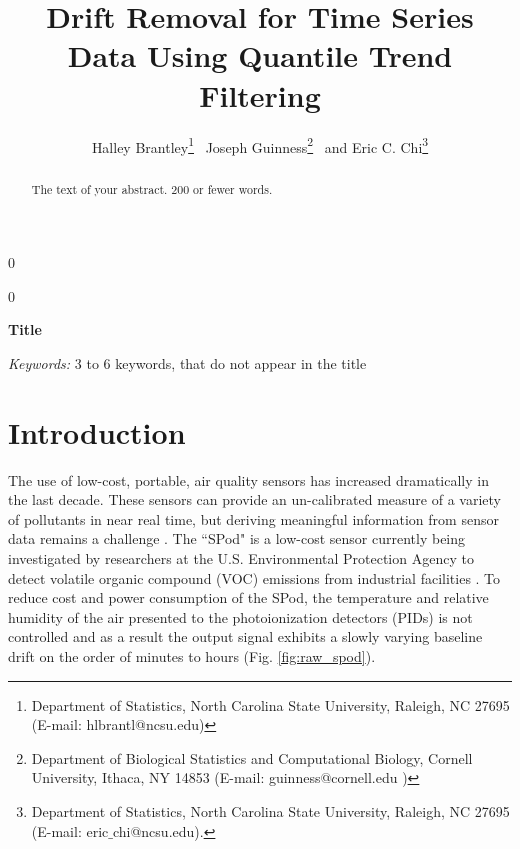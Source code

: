 \documentclass[12pt]{article}
\newcommand{\blind}{0}
\begin{document}
	
	
	\def\spacingset#1{\renewcommand{\baselinestretch}%
		{#1}\small\normalsize} \spacingset{1}
	
	
	
	\blind
	{
		\title{\bf Drift Removal for Time Series Data Using Quantile Trend Filtering}
		\author{Halley Brantley\thanks{
				Department of Statistics, North Carolina State University, Raleigh, NC 27695 (E-mail: hlbrantl@ncsu.edu)} \,
			Joseph Guinness\thanks{
				Department of Biological Statistics and Computational Biology, Cornell University, Ithaca, NY 14853 (E-mail: guinness@cornell.edu )} \,
			and
			Eric C. Chi\thanks{Department of Statistics, North Carolina State University, Raleigh, NC 27695 (E-mail: eric$\_$chi@ncsu.edu).}    \\}
		\date{}
		\maketitle
	} \fi
		
	\blind
	{
		\bigskip
		\bigskip
		\bigskip
		\begin{center}
			{\LARGE\bf Title}
		\end{center}
		\medskip
	} \fi
	
	\bigskip
	\begin{abstract}
		The text of your abstract.  200 or fewer words.
	\end{abstract}
	
	\noindent%
	{\it Keywords:}  3 to 6 keywords, that do not appear in the title
	\vfill
	
	\newpage
	\spacingset{1.5} %
	\section{Introduction}
	\label{sec:intro}
	
	The use of low-cost, portable, air quality sensors has increased dramatically in the last decade. These sensors can provide an un-calibrated measure of a variety of pollutants in near real time, but deriving meaningful information from sensor data remains a challenge \citep{snyder2013changing}. The ``SPod" is a low-cost sensor currently being investigated by researchers at the U.S. Environmental Protection Agency to detect volatile organic compound (VOC) emissions from industrial facilities \citep{thoma2016south}. To reduce cost and power consumption of the SPod, the temperature and relative humidity of the air presented to the photoionization detectors (PIDs) is not controlled and as a result the output signal exhibits a slowly varying baseline drift on the order of minutes to hours (Fig. \ref{fig:raw_spod}).   
	 
\end{document}
